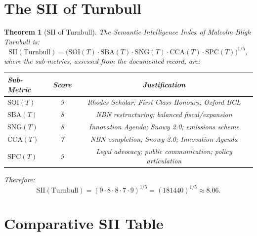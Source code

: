 \documentclass[12pt,anyside]{book}
\theoremstyle{plain}
\newtheorem{theorem}{Theorem}[chapter]
\theoremstyle{definition}
\newcommand{\SII}{\mathrm{SII}}        %
\newcommand{\SOI}{\mathrm{SOI}}        %
\newcommand{\SBA}{\mathrm{SBA}}        %
\newcommand{\SNG}{\mathrm{SNG}}        %
\newcommand{\CCA}{\mathrm{CCA}}        %
\newcommand{\SPC}{\mathrm{SPC}}        %
\begin{document}
\section{The SII of Turnbull}

\begin{theorem}[SII of Turnbull]\label{thm:siiT}
The Semantic Intelligence Index of Malcolm Bligh Turnbull is:
\[
\SII(\text{Turnbull}) =
\bigl(\SOI(T) \cdot \SBA(T) \cdot \SNG(T) \cdot \CCA(T) \cdot \SPC(T)\bigr)^{1/5},
\]
where the sub-metrics, assessed from the documented record, are:

\begin{center}
\begin{tabular}{lcc}
\toprule
\textbf{Sub-Metric} & \textbf{Score} & \textbf{Justification} \\
\midrule
$\SOI(T)$ & 9 & Rhodes Scholar; First Class Honours; Oxford BCL \\
$\SBA(T)$ & 8 & NBN restructuring; balanced fiscal/expansion \\
$\SNG(T)$ & 8 & Innovation Agenda; Snowy 2.0; emissions scheme \\
$\CCA(T)$ & 7 & NBN completion; Snowy 2.0; Innovation Agenda \\
$\SPC(T)$ & 9 & Legal advocacy; public communication; policy articulation \\
\bottomrule
\end{tabular}
\end{center}

Therefore:
\[
\SII(\text{Turnbull}) = (9 \cdot 8 \cdot 8 \cdot 7 \cdot 9)^{1/5}
= (181440)^{1/5} \approx 8.06.
\]
\end{theorem}

\section{Comparative SII Table}
\end{document}
